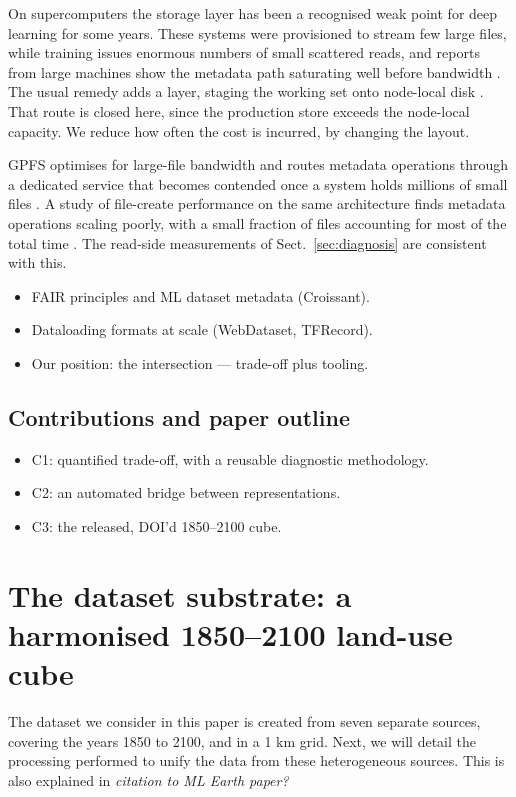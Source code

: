 \documentclass[gmd, manuscript]{copernicus}
\begin{document}
On supercomputers the storage layer has been a recognised weak point for deep learning for some
years. These systems were provisioned to stream few large files, while training issues
enormous numbers of small scattered reads, and reports from large machines show the metadata
path saturating well before bandwidth \citep{nextplatform_hpcfs}. The usual remedy adds a
layer, staging the working set onto node-local disk \citep{hvac2022}. That route is closed
here, since the production store exceeds the node-local capacity. We reduce how often the cost
is incurred, by changing the layout.

GPFS optimises for large-file bandwidth and routes metadata operations through a dedicated
service that becomes contended once a system holds millions of small files \citep{weka_gpfs}.
A study of file-create performance on the same architecture finds metadata operations scaling
poorly, with a small fraction of files accounting for most of the total time
\citep{vef2016gpfs}. The read-side measurements of Sect.~\ref{sec:diagnosis} are consistent
with this.

\begin{itemize}
\item FAIR principles and ML dataset metadata (Croissant).
\item Dataloading formats at scale (WebDataset, TFRecord).
\item Our position: the intersection --- trade-off plus tooling.
\end{itemize}

\subsection{Contributions and paper outline}
\begin{itemize}
\item C1: quantified trade-off, with a reusable diagnostic methodology.
\item C2: an automated bridge between representations.
\item C3: the released, DOI'd 1850--2100 cube.
\end{itemize}

\section{The dataset substrate: a harmonised 1850--2100 land-use cube}
\label{sec:substrate}
The dataset we consider in this paper is created from seven separate sources, covering the years 1850 to 2100, and in a 1 km grid. Next, we will detail the processing performed to unify the data from these heterogeneous sources. This is also explained in \textit{citation to ML Earth paper?}
\end{document}
